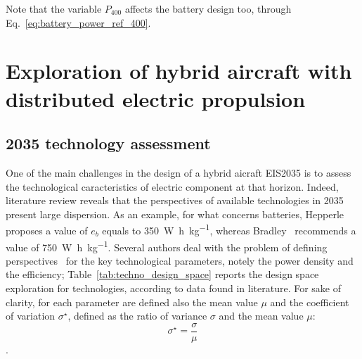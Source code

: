 Note that the variable $P_{400}$ affects the battery design too, through Eq.~\eqref{eq:battery_power_ref_400}. 

\section{Exploration of hybrid aircraft with distributed electric propulsion}
\label{sec:chap3_hybrid_ac_exploration}

\subsection{2035 technology assessment}
\label{subsec:chap3_2035_techno_assess}

One of the main challenges in the design of a hybrid aicraft EIS2035 is to assess the technological caracteristics of electric component at that horizon. 
Indeed, literature review reveals that the perspectives of available technologies in 2035 present large dispersion. 
As an example, for what concerns batteries, Hepperle~\cite{bib:hepperle} proposes a value of $e_b$ equals to 350~\si{\watt\hour\per\kilogram}, whereas Bradley~\cite{bib:bradley_sugar_p2} recommends a value of 750~\si{\watt\hour\per\kilogram}.
Several authors deal with the problem of defining perspectives~\cite{bib:fraunhofer, bib:steiner, bib:bradley_sugar_p2_v2, bib:hepperle, bib:dever, bib:brown_n3x, bib:kuhn, bib:naec, bib:madavan, bib:cinar_methods, bib:pornet_2014} for the key technological parameters, notely the power density and the efficiency; Table~\ref{tab:techno_design_space} reports the design space exploration for technologies, according to data found in literature.
For sake of clarity, for each parameter are defined also the mean value $\mu$ and the coefficient of variation $\sigma^\star$, defined as the ratio of variance $\sigma$ and the mean value $\mu$:
\begin{equation}
	\label{eq:coefficient_variation}
	\sigma^\star = \frac{\sigma}{\mu}
\end{equation}.

